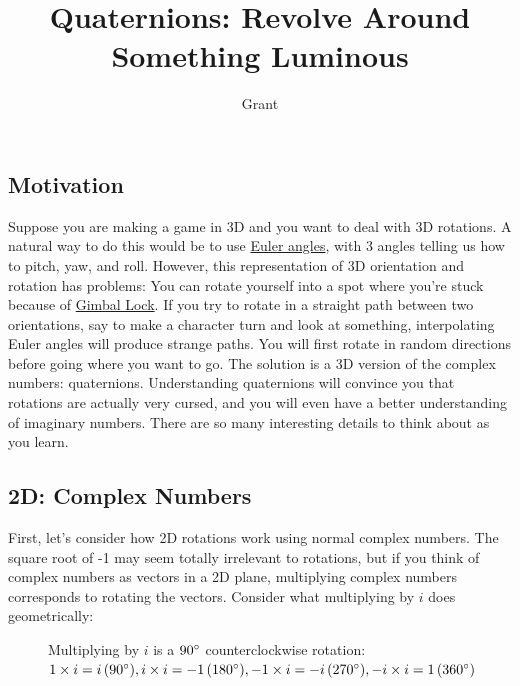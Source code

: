 \documentclass[12pt]{article}
\begin{document}
 
%
%
 
\title{Quaternions: Revolve Around Something Luminous} %
\author{Grant} %
\maketitle

\subsection{Motivation}
Suppose you are making a game in 3D and you want to deal with 3D rotations. A natural way to do this would be to use \href{https://en.wikipedia.org/wiki/Euler_angles}{Euler angles}, with 3 angles telling us how to pitch, yaw, and roll. However, this representation of 3D orientation and rotation has problems: You can rotate yourself into a spot where you're stuck because of \href{https://en.wikipedia.org/wiki/Gimbal_lock}{Gimbal Lock}. If you try to rotate in a straight path between two orientations, say to make a character turn and look at something, interpolating Euler angles will produce strange paths. You will first rotate in random directions before going where you want to go. The solution is a 3D version of the complex numbers: quaternions. Understanding quaternions will convince you that rotations are actually very cursed, and you will even have a better understanding of imaginary numbers. There are so many interesting details to think about as you learn.

\subsection{2D: Complex Numbers}

First, let's consider how 2D rotations work using normal complex numbers. The square root of -1 may seem totally irrelevant to rotations, but if you think of complex numbers as vectors in a 2D plane, multiplying complex numbers corresponds to rotating the vectors. Consider what multiplying by $i$ does geometrically:

\begin{figure}[h]
    \centering
    \caption{Multiplying by $i$ is a $90\degree$ counterclockwise rotation: $1 \times i = i\,(90\degree), i \times i = -1 \,(180\degree),-1\times i = -i\, (270\degree),-i \times i = 1 \,(360\degree)$}
    \label{complexplane}
\end{figure}
\end{document}
